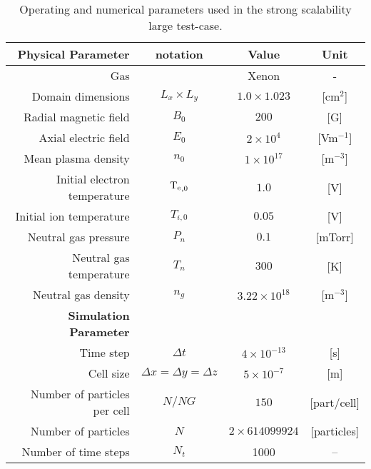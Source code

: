 \begin{table}[htbp] %
     \centering
     \caption{\label{parameters-strong-scalability} Operating and numerical parameters used in the strong scalability large test-case.}
     \begin{tabular}{@{}r c c c@{}} 
        \toprule
        {\bf Physical Parameter} & notation & Value & Unit \\
        \midrule
        Gas & & Xenon & - \\
        Domain dimensions & $L_{x} \times L_{y}$ & $1.0 \times 1.023$ & [cm$^2$] \\
        Radial magnetic field & $B_{0}$                    & $200$                 & [{G}] \\
        Axial electric field & $E_{0}$                    & $2 \times 10^{4}$     & [{Vm}$^{-1}$] \\
        Mean plasma density & $n_{0}$                    & $1 \times 10^{17}$    & [{m}$^{-3}$] \\
        Initial electron temperature & $\mathrm{T_e}_{,0}  $               & $1.0$                 & [{V}] \\
        Initial ion temperature & $T_{i,0}   $               & $0.05$                 & [{V}] \\
        Neutral gas pressure & $P_{n}     $               & $0.1$                 & [{mTorr}] \\
        Neutral gas temperature & $T_{n}     $               & $300$                 & [{K}] \\
        Neutral gas density & $n_{g}     $               & $3.22 \times 10^{18}$ & [{m}$^{-3}$]\\
        \midrule
        {\bf Simulation Parameter} &  &   &  \\
        
        Time step & $\Delta t  $                      & $4 \times 10^{-13}$ & [{s}] \\
        Cell size & $\Delta x = \Delta y = \Delta z $ & $5 \times 10^{-7}$  & [{m}] \\
        Number of particles per cell & $N/NG      $                      & $150$                & [{part/cell}] \\
        Number of particles & $N      $                      & $2 \times 614099924$                & [{particles}] \\
        
        Number of time steps & $N_t$ & 1000 & --\\
        
        
        \bottomrule
     \end{tabular}
  \end{table}
  
